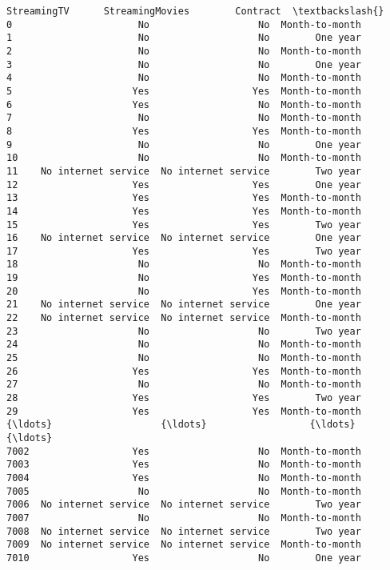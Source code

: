 \documentclass[11pt]{article}
\begin{document}
\begin{tcolorbox}[breakable, boxrule=.5pt, size=fbox, pad at break*=1mm, opacityfill=0]
\begin{Verbatim}[commandchars=\\\{\}]
              StreamingTV      StreamingMovies        Contract  \textbackslash{}
0                      No                   No  Month-to-month
1                      No                   No        One year
2                      No                   No  Month-to-month
3                      No                   No        One year
4                      No                   No  Month-to-month
5                     Yes                  Yes  Month-to-month
6                     Yes                   No  Month-to-month
7                      No                   No  Month-to-month
8                     Yes                  Yes  Month-to-month
9                      No                   No        One year
10                     No                   No  Month-to-month
11    No internet service  No internet service        Two year
12                    Yes                  Yes        One year
13                    Yes                  Yes  Month-to-month
14                    Yes                  Yes  Month-to-month
15                    Yes                  Yes        Two year
16    No internet service  No internet service        One year
17                    Yes                  Yes        Two year
18                     No                   No  Month-to-month
19                     No                  Yes  Month-to-month
20                     No                  Yes  Month-to-month
21    No internet service  No internet service        One year
22    No internet service  No internet service  Month-to-month
23                     No                   No        Two year
24                     No                   No  Month-to-month
25                     No                   No  Month-to-month
26                    Yes                  Yes  Month-to-month
27                     No                   No  Month-to-month
28                    Yes                  Yes        Two year
29                    Yes                  Yes  Month-to-month
{\ldots}                   {\ldots}                  {\ldots}             {\ldots}
7002                  Yes                   No  Month-to-month
7003                  Yes                   No  Month-to-month
7004                  Yes                   No  Month-to-month
7005                   No                   No  Month-to-month
7006  No internet service  No internet service        Two year
7007                   No                   No  Month-to-month
7008  No internet service  No internet service        Two year
7009  No internet service  No internet service  Month-to-month
7010                  Yes                   No        One year

\end{Verbatim}
\end{tcolorbox}
\end{document}
